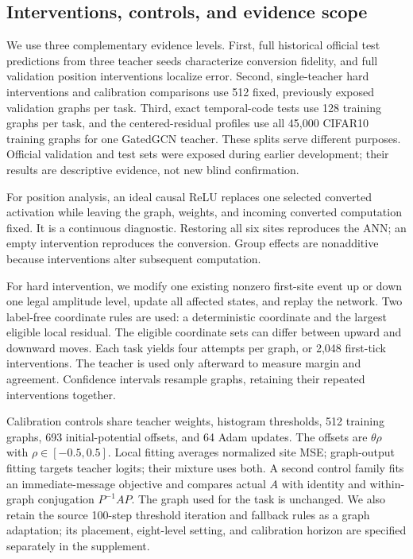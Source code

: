 \documentclass[10pt,twocolumn,letterpaper]{article}
\begin{document}
\subsection{Interventions, controls, and evidence scope}
We use three complementary evidence levels. First, full historical official test predictions from three teacher seeds characterize conversion fidelity, and full validation position interventions localize error. Second, single-teacher hard interventions and calibration comparisons use 512 fixed, previously exposed validation graphs per task. Third, exact temporal-code tests use 128 training graphs per task, and the centered-residual profiles use all 45,000 CIFAR10 training graphs for one GatedGCN teacher. These splits serve different purposes. Official validation and test sets were exposed during earlier development; their results are descriptive evidence, not new blind confirmation.

For position analysis, an ideal causal ReLU replaces one selected converted activation while leaving the graph, weights, and incoming converted computation fixed. It is a continuous diagnostic. Restoring all six sites reproduces the ANN; an empty intervention reproduces the conversion. Group effects are nonadditive because interventions alter subsequent computation.

For hard intervention, we modify one existing nonzero first-site event up or down one legal amplitude level, update all affected states, and replay the network. Two label-free coordinate rules are used: a deterministic coordinate and the largest eligible local residual. The eligible coordinate sets can differ between upward and downward moves. Each task yields four attempts per graph, or 2,048 first-tick interventions. The teacher is used only afterward to measure margin and agreement. Confidence intervals resample graphs, retaining their repeated interventions together.

Calibration controls share teacher weights, histogram thresholds, 512 training graphs, 693 initial-potential offsets, and 64 Adam updates. The offsets are $\theta\rho$ with $\rho\in[-0.5,0.5]$. Local fitting averages normalized site MSE; graph-output fitting targets teacher logits; their mixture uses both. A second control family fits an immediate-message objective and compares actual $A$ with identity and within-graph conjugation $P^{-1}AP$. The graph used for the task is unchanged. We also retain the source 100-step threshold iteration and fallback rules as a graph adaptation; its placement, eight-level setting, and calibration horizon are specified separately in the supplement.
\end{document}

